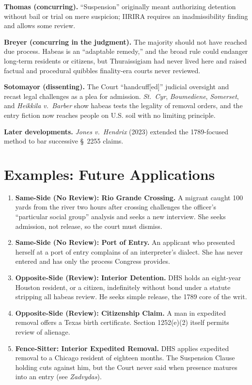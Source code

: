 \documentclass[12pt]{article}
\begin{document}
\textbf{Thomas (concurring).} ``Suspension'' originally meant authorizing detention without bail or trial on mere suspicion; IIRIRA requires an inadmissibility finding and allows some review.

\textbf{Breyer (concurring in the judgment).} The majority should not have reached due process. Habeas is an ``adaptable remedy,'' and the broad rule could endanger long-term residents or citizens, but Thuraissigiam had never lived here and raised factual and procedural quibbles finality-era courts never reviewed.

\textbf{Sotomayor (dissenting).} The Court ``handcuff[ed]'' judicial oversight and recast legal challenges as a plea for admission. \textit{St.\ Cyr}, \textit{Boumediene}, \textit{Somerset}, and \textit{Heikkila v.\ Barber} show habeas tests the legality of removal orders, and the entry fiction now reaches people on U.S. soil with no limiting principle.

\textbf{Later developments.} \textit{Jones v.\ Hendrix} (2023) extended the 1789-focused method to bar successive \S\ 2255 claims.

\section{Examples: Future Applications}

\begin{enumerate}
\item \textbf{Same-Side (No Review): Rio Grande Crossing.} A migrant caught 100 yards from the river two hours after crossing challenges the officer's ``particular social group'' analysis and seeks a new interview. She seeks admission, not release, so the court must dismiss.
\item \textbf{Same-Side (No Review): Port of Entry.} An applicant who presented herself at a port of entry complains of an interpreter's dialect. She has never entered and has only the process Congress provides.
\item \textbf{Opposite-Side (Review): Interior Detention.} DHS holds an eight-year Houston resident, or a citizen, indefinitely without bond under a statute stripping all habeas review. He seeks simple release, the 1789 core of the writ.
\item \textbf{Opposite-Side (Review): Citizenship Claim.} A man in expedited removal offers a Texas birth certificate. Section 1252(e)(2) itself permits review of alienage.
\item \textbf{Fence-Sitter: Interior Expedited Removal.} DHS applies expedited removal to a Chicago resident of eighteen months. The Suspension Clause holding cuts against him, but the Court never said when presence matures into an entry (see \textit{Zadvydas}).
\end{enumerate}
\end{document}
